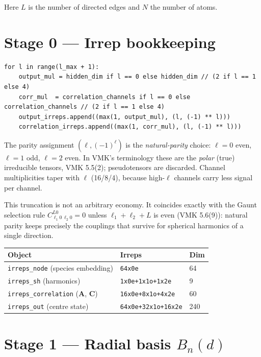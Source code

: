 \documentclass[11pt,a4paper]{article}
\newcommand{\code}[1]{\texttt{\small #1}}
\newcommand{\NOTE}[1]{\textcolor{note}{#1}}
\begin{document}
Here $L$ is the number of directed edges and $N$ the number of atoms.

\section{Stage 0 --- Irrep bookkeeping}

\begin{lstlisting}
for l in range(l_max + 1):
    output_mul = hidden_dim if l == 0 else hidden_dim // (2 if l == 1 else 4)
    corr_mul  = correlation_channels if l == 0 else correlation_channels // (2 if l == 1 else 4)
    output_irreps.append((max(1, output_mul), (l, (-1) ** l)))
    correlation_irreps.append((max(1, corr_mul), (l, (-1) ** l)))
\end{lstlisting}

The parity assignment $(\ell,(-1)^\ell)$ is the \emph{natural-parity} choice:
$\ell=0$ even, $\ell=1$ odd, $\ell=2$ even. In VMK's terminology these are the
\emph{polar} (true) irreducible tensors, VMK 5.5(2); pseudotensors are discarded.
Channel multiplicities taper with $\ell$ (16/8/4), because high-$\ell$ channels
carry less signal per channel.

\NOTE{This truncation is not an arbitrary economy.} It coincides exactly with the
Gaunt selection rule $C^{L0}_{\ell_1 0\,\ell_2 0}=0$ unless $\ell_1+\ell_2+L$ is
even (VMK 5.6(9)): natural parity keeps precisely the couplings that survive for
spherical harmonics of a single direction.

\begin{center}\small
\begin{tabular}{@{}lll@{}}
\toprule
Object & Irreps & Dim \\
\midrule
\code{irreps\_node} (species embedding)      & \code{64x0e}            & 64 \\
\code{irreps\_sh} (harmonics)                & \code{1x0e+1x1o+1x2e}   & 9 \\
\code{irreps\_correlation} ($\bm A$, $\bm C$)& \code{16x0e+8x1o+4x2e}  & 60 \\
\code{irreps\_out} (centre state)            & \code{64x0e+32x1o+16x2e}& 240 \\
\bottomrule
\end{tabular}
\end{center}

\section{Stage 1 --- Radial basis \texorpdfstring{$B_n(d)$}{Bn(d)}}
\end{document}
